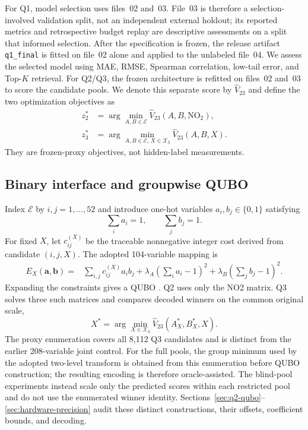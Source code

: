 For Q1, model selection uses files~02 and~03.  File~03 is therefore a
selection-involved validation split, not an independent external holdout;
its reported metrics and retrospective budget replay are descriptive
assessments on a split that informed selection.  After the specification
is frozen, the release artifact \texttt{q1\_final} is fitted on file~02
alone and applied to the unlabeled file~04.  We assess the selected model
using MAE, RMSE, Spearman correlation, low-tail error, and Top-$K$
retrieval.  For Q2/Q3, the frozen architecture is refitted on files~02
and~03 to score the candidate pools.  We denote this separate score by
$\widehat V_{23}$ and define the two optimization objectives as
\begin{align}
 z_2^*&=\arg\min_{A,B\in\mathcal E}\widehat V_{23}(A,B,\mathrm{NO}_2),
 \label{eq:q2-objective}\\
 z_3^*&=\arg\min_{A,B\in\mathcal E,\,X\in\mathcal X_3}
 \widehat V_{23}(A,B,X).
 \label{eq:q3-objective}
\end{align}
They are frozen-proxy objectives, not hidden-label measurements.

\subsection{Binary interface and groupwise QUBO}

Index $\mathcal E$ by $i,j=1,\ldots,52$ and introduce one-hot variables
$a_i,b_j\in\{0,1\}$ satisfying
\begin{equation}
 \sum_i a_i=1,\qquad \sum_j b_j=1.
 \label{eq:one-hot-constraints}
\end{equation}
For fixed $X$, let $c_{ij}^{(X)}$ be the traceable nonnegative integer cost
derived from candidate $(i,j,X)$.  The adopted 104-variable mapping is
\begin{align}
 E_X(\bm a,\bm b)={}&\sum_{i,j}c_{ij}^{(X)}a_i b_j
 +\lambda_A\left(\sum_i a_i-1\right)^2
 +\lambda_B\left(\sum_j b_j-1\right)^2 .
 \label{eq:group-qubo}
\end{align}
Expanding the constraints gives a QUBO
\cite{Glover2019QUBOTutorial,Lucas2014IsingNP}.  Q2 uses only the NO2
matrix.  Q3 solves three such matrices and compares decoded winners on the
common original scale,
\begin{equation}
 X^*=\arg\min_{X\in\mathcal X_3}
 \widehat V_{23}(A_X^*,B_X^*,X).
 \label{eq:q3-group-comparison}
\end{equation}
The proxy enumeration covers all 8,112 Q3 candidates and is distinct from the
earlier 208-variable joint control.  For the full pools, the group minimum
used by the adopted two-level transform is obtained from this enumeration
before QUBO construction; the resulting encoding is therefore
oracle-assisted.  The blind-pool experiments instead scale only the
predicted scores within each restricted pool and do not use the enumerated
winner identity.  Sections~\ref{sec:q2-qubo}--\ref{sec:hardware-precision}
audit these distinct constructions, their offsets, coefficient bounds,
and decoding.

